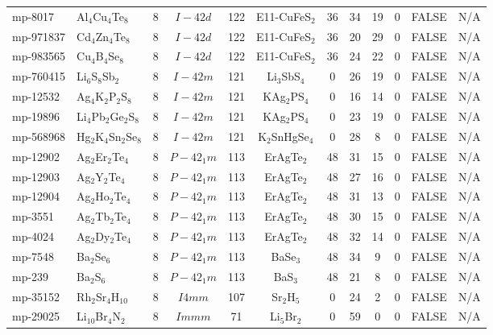 {\begin{longtable}{llcccccccccc}
    mp-8017 & Al$_{4}$Cu$_{4}$Te$_{8}$ & 8     & $I-42d$ & 122   & E11-CuFeS$_{2}$ & 36    & 34    & 19    & 0     & FALSE & N/A \\
    mp-971837 & Cd$_{4}$Zn$_{4}$Te$_{8}$ & 8     & $I-42d$ & 122   & E11-CuFeS$_{2}$ & 36    & 20    & 29    & 0     & FALSE & N/A \\
    mp-983565 & Cu$_{4}$B$_{4}$Se$_{8}$ & 8     & $I-42d$ & 122   & E11-CuFeS$_{2}$ & 36    & 24    & 22    & 0     & FALSE & N/A \\
    mp-760415 & Li$_{6}$S$_{8}$Sb$_{2}$ & 8     & $I-42m$ & 121   & Li$_{3}$SbS$_{4}$ & 0     & 26    & 19    & 0     & FALSE & N/A \\
    mp-12532 & Ag$_{4}$K$_{2}$P$_{2}$S$_{8}$ & 8     & $I-42m$ & 121   & KAg$_{2}$PS$_{4}$ & 0     & 16    & 14    & 0     & FALSE & N/A \\
    mp-19896 & Li$_{4}$Pb$_{2}$Ge$_{2}$S$_{8}$ & 8     & $I-42m$ & 121   & KAg$_{2}$PS$_{4}$ & 0     & 23    & 19    & 0     & FALSE & N/A \\
    mp-568968 & Hg$_{2}$K$_{4}$Sn$_{2}$Se$_{8}$ & 8     & $I-42m$ & 121   & K$_{2}$SnHgSe$_{4}$ & 0     & 28    & 8     & 0     & FALSE & N/A \\
    mp-12902 & Ag$_{2}$Er$_{2}$Te$_{4}$ & 8     & $P-42_1m$ & 113   & ErAgTe$_{2}$ & 48    & 31    & 15    & 0     & FALSE & N/A \\
    mp-12903 & Ag$_{2}$Y$_{2}$Te$_{4}$ & 8     & $P-42_1m$ & 113   & ErAgTe$_{2}$ & 48    & 27    & 16    & 0     & FALSE & N/A \\
    mp-12904 & Ag$_{2}$Ho$_{2}$Te$_{4}$ & 8     & $P-42_1m$ & 113   & ErAgTe$_{2}$ & 48    & 31    & 13    & 0     & FALSE & N/A \\
    mp-3551 & Ag$_{2}$Tb$_{2}$Te$_{4}$ & 8     & $P-42_1m$ & 113   & ErAgTe$_{2}$ & 48    & 30    & 15    & 0     & FALSE & N/A \\
    mp-4024 & Ag$_{2}$Dy$_{2}$Te$_{4}$ & 8     & $P-42_1m$ & 113   & ErAgTe$_{2}$ & 48    & 32    & 14    & 0     & FALSE & N/A \\
    mp-7548 & Ba$_{2}$Se$_{6}$ & 8     & $P-42_1m$ & 113   & BaSe$_{3}$ & 48    & 34    & 9     & 0     & FALSE & N/A \\
    mp-239 & Ba$_{2}$S$_{6}$ & 8     & $P-42_1m$ & 113   & BaS$_{3}$ & 48    & 21    & 8     & 0     & FALSE & N/A \\
    mp-35152 & Rh$_{2}$Sr$_{4}$H$_{10}$ & 8     & $I4mm$ & 107   & Sr$_{2}$H$_{5}$ & 0     & 24    & 2     & 0     & FALSE & N/A \\
    mp-29025 & Li$_{10}$Br$_{4}$N$_{2}$ & 8     & $Immm$ & 71    & Li$_{5}$Br$_{2}$ & 0     & 59    & 0     & 0     & FALSE & N/A \\

\end{longtable}}
